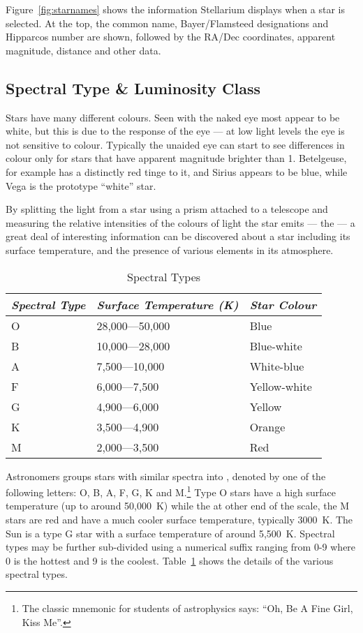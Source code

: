 Figure~\ref{fig:starnames} shows the information
Stellarium displays when a star is selected. At the top, the common
name, Bayer/Flamsteed designations and Hipparcos number are shown,
followed by the RA/Dec coordinates, apparent magnitude, distance and
other data.

\subsection{Spectral Type \& Luminosity Class}
\label{sec:Phenomena:SpectralTypeLuminosityClass}

Stars have many different colours. Seen with the naked eye most appear
to be white, but this is due to the response of the eye --- at low
light levels the eye is not sensitive to colour. Typically the unaided
eye can start to see differences in colour only for stars that have
apparent magnitude brighter than 1. Betelgeuse, for example has a
distinctly red tinge to it, and Sirius appears to be blue, while Vega
is the prototype ``white'' star.

By splitting the light from a star using a prism attached to a telescope
and measuring the relative intensities of the colours of light the star
emits --- the  --- a great deal of interesting information
can be discovered about a star including its surface temperature, and
the presence of various elements in its atmosphere.

\begin{table}[tb]
  \centering\small
  \begin{tabular}{lll}
\toprule
\emph{Spectral Type} & \emph{Surface Temperature (K)} & \emph{Star Colour}\\\midrule
O & 28,000---50,000 & Blue\\
B & 10,000---28,000 & Blue-white\\
A & 7,500---10,000 & White-blue\\
F & 6,000---7,500 & Yellow-white\\
G & 4,900---6,000 & Yellow\\
K & 3,500---4,900 & Orange\\
M & 2,000---3,500 & Red\\
\bottomrule    
  \end{tabular}
  \caption{Spectral Types}
  \label{tab:spectraltype}
\end{table}

Astronomers groups stars with similar spectra into , denoted by one of the following letters: O, B, A, F, G, K
and M.\footnote{The classic mnemonic for students of astrophysics
  says: ``Oh, Be A Fine Girl, Kiss Me''.}  Type O stars have a high
surface temperature (up to around 50,000~K) while the at other end of
the scale, the M stars are red and have a much cooler surface
temperature, typically 3000~K. The Sun is a type G star with a surface
temperature of around 5,500~K. Spectral types may be further
sub-divided using a numerical suffix ranging from 0-9 where 0 is the
hottest and 9 is the coolest. Table~\ref{tab:spectraltype} shows the
details of the various spectral types.

